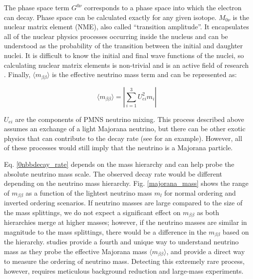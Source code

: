 The phase space term $G^{0\nu}$ corresponds to a phase space into which the electron can decay. Phase space can be calculated exactly for any given isotope. $M_{0\nu}$ is the nuclear matrix element (NME), also called ``transition amplitude''. It encapsulates all of the nuclear physics processes occurring inside the nucleus and can be understood as the probability of the transition between the initial and daughter nuclei. It is difficult to know the initial and final wave functions of the nuclei, so calculating nuclear matrix elements is non-trivial and is an active field of research \cite{Menendez:2017fdf}. Finally, $\langle m_{\beta\beta}\rangle$ is the effective neutrino mass term and can be represented as:

\begin{equation}\label{effective_mjd_mass}
\langle m_{\beta\beta}\rangle =  \left|\sum_{i=1}^{3} U^2_{ei}m_i\right|
\end{equation}

$U_{ei}$ are the components of PMNS neutrino mixing. This process described above assumes an exchange of a light Majorana neutrino, but there can be other exotic physics that can contribute to the decay rate (see \cite{Schechter_1982} for an example). However, all of these processes would still imply that the neutrino is a Majorana particle.

Eq. \ref{0nbbdecay_rate} depends on the mass hierarchy and can help probe the absolute neutrino mass scale. The observed decay rate would be different depending on the neutrino mass hierarchy. Fig. \ref{majorana_mass} shows the range of $m_{\beta\beta}$ as a function of the lightest neutrino mass $m_l$ for normal ordering and inverted ordering scenarios. If neutrino masses are large compared to the size of the mass splittings, we do not expect a significant effect on $m_{\beta\beta}$ as both hierarchies merge at higher masses; however, if the neutrino masses are similar in magnitude to the mass splittings, there would be a difference in the $m_{\beta\beta}$ based on the hierarchy. {\onbb} studies provide a fourth and unique way to understand neutrino mass as they probe the effective Majorana mass $\langle m_{\beta\beta}\rangle$, and provide a direct way to measure the ordering of neutrino mass. Detecting this extremely rare process, however, requires meticulous background reduction and large-mass experiments.

